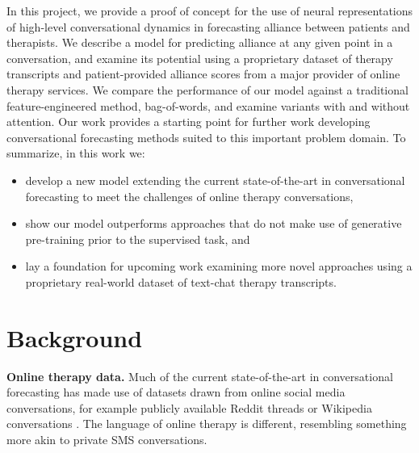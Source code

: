 \documentclass{article}
\begin{document}
In this project, we provide a proof of concept for the use of neural representations of high-level conversational dynamics in forecasting alliance between patients and therapists. We describe a model for predicting alliance at any given point in a conversation, and examine its potential using a proprietary dataset of therapy transcripts and patient-provided alliance scores from a major provider of online therapy services. We compare the performance of our model against a traditional feature-engineered method, bag-of-words, and examine variants with and without attention. Our work provides a starting point for further work developing conversational forecasting methods suited to this important problem domain. To summarize, in this work we:

\begin{itemize}
  \item develop a new model extending the current state-of-the-art in conversational forecasting to meet the challenges of online therapy conversations,
  \item show our model outperforms approaches that do not make use of generative pre-training prior to the supervised task, and
  \item lay a foundation for upcoming work examining more novel approaches using a proprietary real-world dataset of text-chat therapy transcripts.
\end{itemize}

\section{Background}
\label{sec:background}


\textbf{Online therapy data.} Much of the current state-of-the-art in conversational forecasting has made use of datasets drawn from online social media conversations, for example publicly available Reddit threads \cite{zhang2018conversations} or Wikipedia conversations \cite{Chang-Trouble:19}. The language of online therapy is different, resembling something more akin to private SMS conversations. 
\end{document}
